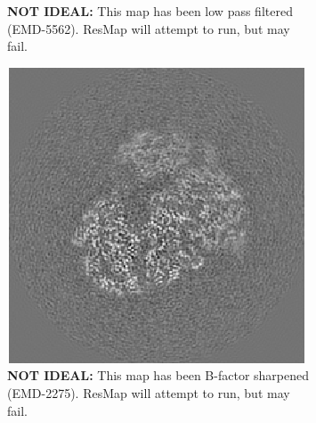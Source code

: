 \documentclass[10pt]{article}
\begin{document}
\begin{figure}[!ht]
\begin{subfigure}[b]{0.4\textwidth}
	        \caption{\textcolor{RedOrange}{\textbf{NOT IDEAL:}} This map has been low pass filtered (EMD-5562). ResMap will attempt to run, but may fail.\newline}
	\end{subfigure}
	\begin{subfigure}[b]{0.4\textwidth}
	        \centering
	        \includegraphics[width=\textwidth]{img/4_2275.png}
	        \caption{\textcolor{RedOrange}{\textbf{NOT IDEAL:}} This map has been B-factor sharpened (EMD-2275). ResMap will attempt to run, but may fail. \newline}
	\end{subfigure}
	\qquad %
	\begin{subfigure}[b]{0.4\textwidth}
	        \centering

\end{subfigure}
\end{figure}
\end{document}
